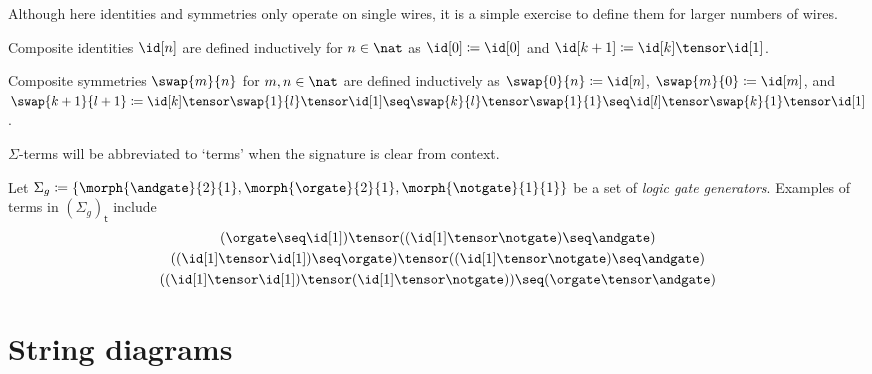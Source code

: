 Although here identities and symmetries only operate on single wires, it is
a simple exercise to define them for larger numbers of wires.

\begin{notation}\label{not:composite-identities}
    Composite identities \(\id[n]\) are defined inductively for \(n \in \nat\)
    as \(
    \id[0] \coloneqq \id[0]\) and \(
    \id[k+1]
    \coloneqq
    \id[k] \tensor \id[1]
    \).
\end{notation}
\begin{notation}\label{not:composite-symmetries}
    Composite symmetries \(\swap{m}{n}\) for \(m, n \in \nat\) are defined
    inductively as \(
    \swap{0}{n}
    \coloneqq
    \id[n]
    \), \(
    \swap{m}{0}
    \coloneqq \id[m]
    \), and \(
    \swap{k+1}{l+1}
    \coloneqq
    \id[k] \tensor \swap{1}{l} \tensor \id[1]
    \seq
    \swap{k}{l} \tensor \swap{1}{1}
    \seq
    \id[l] \tensor \swap{k}{1} \tensor \id[1]
    \).
\end{notation}

\(\Sigma\)-terms will be abbreviated to `terms' when the signature is clear from
context.

\begin{example}\label{ex:terms}
    Let \(
    \Sigma_g
    \coloneqq
    \{\morph{\andgate}{2}{1}, \morph{\orgate}{2}{1}, \morph{\notgate}{1}{1}\}
    \) be a set of \emph{logic gate generators}.
    Examples of terms in \((\Sigma_g)_\mathsf{t}\) include
    \begin{gather*}
        (\orgate \seq \id[1]) \tensor ((\id[1] \tensor \notgate) \seq \andgate)
        \\
        ((\id[1] \tensor \id[1]) \seq \orgate) \tensor ((\id[1] \tensor \notgate) \seq \andgate)
        \\
        ((\id[1] \tensor \id[1]) \tensor (\id[1] \tensor \notgate)) \seq (\orgate \tensor \andgate)
    \end{gather*}
\end{example}

\section{String diagrams}

